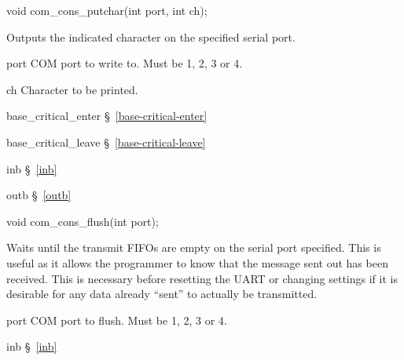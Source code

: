 \label{com-cons-putchar}
\begin{apisyn}

	\funcproto void com_cons_putchar(int port, int ch);
\end{apisyn}
\begin{apidesc}
	Outputs the indicated character on the specified serial port.
\end{apidesc}
\begin{apiparm}
	\item[port]
		COM port to write to.
		Must be 1, 2, 3 or 4.
	\item[ch]
		Character to be printed.
\end{apiparm}
\begin{apidep}
	\item[base_critical_enter]	\S~\ref{base-critical-enter}
	\item[base_critical_leave]	\S~\ref{base-critical-leave}
	\item[inb]			\S~\ref{inb}
	\item[outb]			\S~\ref{outb}
\end{apidep}

\label{com-cons-flush}
\begin{apisyn}

	\funcproto void com_cons_flush(int port);
\end{apisyn}
\begin{apidesc}
	Waits until the transmit FIFOs are empty on the serial port
	specified.
	This is useful as it allows the programmer to know that the
	message sent out has been received.
	This is necessary before resetting the UART or changing
	settings if it is desirable for any data already ``sent''
	to actually be transmitted.
\end{apidesc}
\begin{apiparm}
	\item[port]
		COM port to flush.
		Must be 1, 2, 3 or 4.
\end{apiparm}
\begin{apidep}
	\item[inb]	\S~\ref{inb}
\end{apidep}

